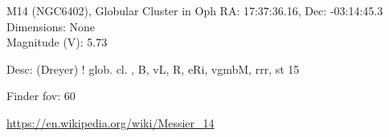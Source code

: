 \begin{block}{M14 (NGC6402), Globular Cluster in Oph}
    RA: 17:37:36.16, Dec: -03:14:45.3 \\ 
    Dimensions: None \\ 
    Magnitude (V): 5.73


    Desc: (Dreyer) ! glob. cl. , B, vL, R, eRi, vgmbM, rrr, st 15 

    Finder fov: 60 

    \url{https://en.wikipedia.org/wiki/Messier_14} 
\end{block}